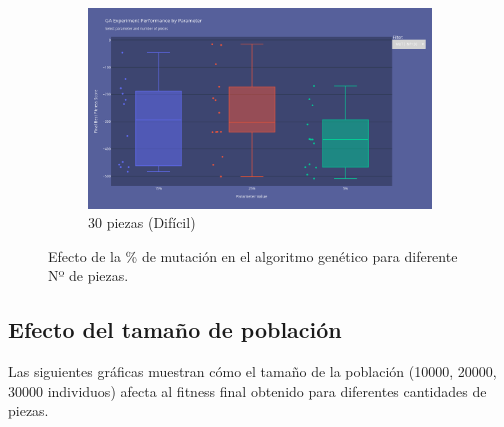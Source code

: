 \documentclass[11pt,spanish,listoffigures,listoftables]{tfgetsinf}
\begin{document}
\begin{figure}[H]
    \begin{subfigure}[b]{0.48\textwidth}
        \centering
        \includegraphics[width=\textwidth]{images/GA_np-30_mutation.png}
        \caption{30 piezas (Difícil)}
        \label{fig:ga_np30_mutation}
    \end{subfigure}
    \caption{Efecto de la \% de mutación en el algoritmo genético para diferente Nº de piezas.}
    \label{fig:ga_mutation}
\end{figure}

\subsection{Efecto del tamaño de población}

Las siguientes gráficas muestran cómo el tamaño de la población (10000, 20000, 30000 individuos) afecta al fitness final obtenido para diferentes cantidades de piezas.
\end{document}
